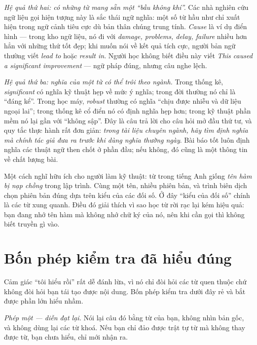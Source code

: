 \documentclass[../../english.tex]{subfiles}
\begin{document}
\emph{Hệ quả thứ hai: có những từ mang sẵn một ``bầu không khí''.} Các nhà nghiên cứu ngữ liệu gọi hiện tượng này là sắc thái ngữ nghĩa\cite{louw1993}: một số từ hầu như chỉ xuất hiện trong ngữ cảnh tiêu cực dù bản thân chúng trung tính. \emph{Cause} là ví dụ điển hình --- trong kho ngữ liệu, nó đi với \emph{damage, problems, delay, failure} nhiều hơn hẳn với những thứ tốt đẹp; khi muốn nói về kết quả tích cực, người bản ngữ thường viết \emph{lead to} hoặc \emph{result in}. Người học không biết điều này viết \emph{This caused a significant improvement} --- ngữ pháp đúng, nhưng câu nghe lệch.

\emph{Hệ quả thứ ba: nghĩa của một từ có thể trôi theo ngành.} Trong thống kê, \emph{significant} có nghĩa kỹ thuật hẹp về mức ý nghĩa; trong đời thường nó chỉ là ``đáng kể''. Trong học máy, \emph{robust} thường có nghĩa ``chịu được nhiễu và dữ liệu ngoại lai''; trong thống kê cổ điển nó có định nghĩa hẹp hơn; trong kỹ thuật phần mềm nó lại gần với ``không sập''. Đây là câu trả lời cho câu hỏi mở đầu thứ tư, và quy tắc thực hành rất đơn giản: \emph{trong tài liệu chuyên ngành, hãy tìm định nghĩa mà chính tác giả đưa ra trước khi dùng nghĩa thường ngày}. Bài báo tốt luôn định nghĩa các thuật ngữ then chốt ở phần đầu; nếu không, đó cũng là một thông tin về chất lượng bài.

\begin{trucgiac}
Một cách nghĩ hữu ích cho người làm kỹ thuật: từ trong tiếng Anh giống \emph{tên hàm bị nạp chồng} trong lập trình. Cùng một tên, nhiều phiên bản, và trình biên dịch chọn phiên bản đúng dựa trên kiểu của các đối số. Ở đây ``kiểu của đối số'' chính là các từ xung quanh. Điều đó giải thích vì sao học từ rời rạc lại kém hiệu quả: bạn đang nhớ tên hàm mà không nhớ chữ ký của nó, nên khi cần gọi thì không biết truyền gì vào.
\end{trucgiac}

\section{Bốn phép kiểm tra đã hiểu đúng}

Cảm giác ``tôi hiểu rồi'' rất dễ đánh lừa, vì nó chỉ đòi hỏi các từ quen thuộc chứ không đòi hỏi bạn tái tạo được nội dung. Bốn phép kiểm tra dưới đây rẻ và bắt được phần lớn hiểu nhầm.

\emph{Phép một --- diễn đạt lại.} Nói lại câu đó bằng từ của bạn, không nhìn bản gốc, và không dùng lại các từ khoá. Nếu bạn chỉ đảo được trật tự từ mà không thay được từ, bạn chưa hiểu, chỉ mới nhận ra.
\end{document}
